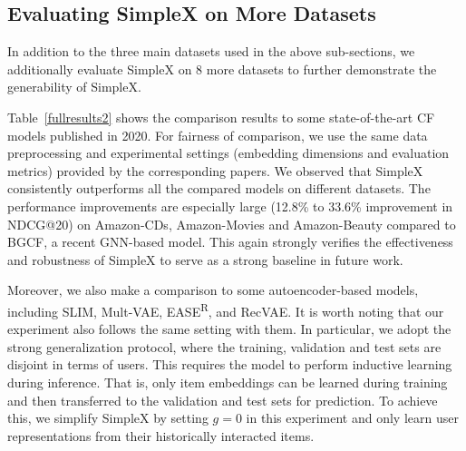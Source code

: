 \documentclass[sigconf,authorversion]{acmart}
\begin{document}
\subsection{Evaluating SimpleX on More Datasets}
In addition to the three main datasets used in the above sub-sections, we additionally evaluate SimpleX on 8 more datasets to further demonstrate the generability of SimpleX.

Table~\ref{fullresults2} shows the comparison results to some state-of-the-art CF models published in 2020. For fairness of comparison, we use the same data preprocessing and experimental settings (embedding dimensions and evaluation metrics) provided by the corresponding papers. We observed that SimpleX consistently outperforms all the compared models on different datasets. The performance improvements are especially large (12.8\% to 33.6\% improvement in NDCG@20) on Amazon-CDs, Amazon-Movies and Amazon-Beauty compared to BGCF, a recent GNN-based model. This again strongly verifies the effectiveness and robustness of SimpleX to serve as a strong baseline in future work. 


Moreover, we also make a comparison to some autoencoder-based models, including SLIM, Mult-VAE, EASE\textsuperscript{R}, and RecVAE. It is worth noting that our experiment also follows the same setting with them. In particular, we adopt the strong generalization protocol, where the training, validation and test sets are disjoint in terms of users. This requires the model to perform inductive learning during inference. That is, only item embeddings can be learned during training and then transferred to the validation and test sets for prediction. To achieve this, we simplify SimpleX by setting $g=0$ in this experiment and only learn user representations from their historically interacted items. 
\end{document}
